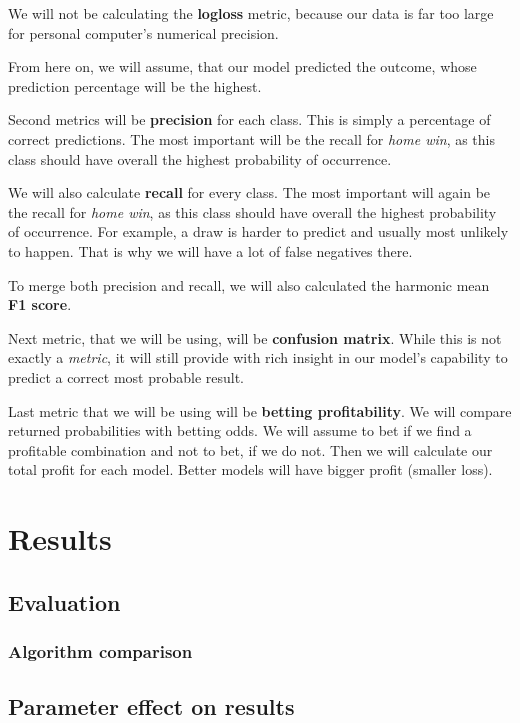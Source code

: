 \documentclass[conference]{IEEEtran}
\begin{document}
We will not be calculating the \textbf{logloss} metric, because our data is far too large for personal computer's numerical 
precision.

From here on, we will assume, that our model predicted the outcome, whose prediction percentage will be the highest. 

Second metrics will be \textbf{precision} for each class. This is simply a percentage of correct predictions. The most important
will be the recall for \textit{home win}, as this class should have overall the highest probability of occurrence.

We will also calculate \textbf{recall} for every class. The most important will again be the recall for \textit{home win}, as 
this class should have overall the highest probability of occurrence. For example, a draw is harder to predict and usually 
most unlikely to happen. That is why we will have a lot of false negatives there.

To merge both precision and recall, we will also calculated the harmonic mean \textbf{F1 score}.

Next metric, that we will be using, will be \textbf{confusion matrix}. While this is not exactly a \textit{metric}, it will 
still provide with rich insight in our model's capability to predict a correct most probable result.

Last metric that we will be using will be \textbf{betting 
profitability}. We will compare returned probabilities with betting 
odds. We will assume to bet if we find a profitable combination and 
not to bet, if we do not. Then we will calculate our total profit for
each model. Better models will have bigger profit (smaller loss).


\section{Results}
\subsection{Evaluation}
\subsubsection{Algorithm comparison}
\subsection{Parameter effect on results}
\end{document}
